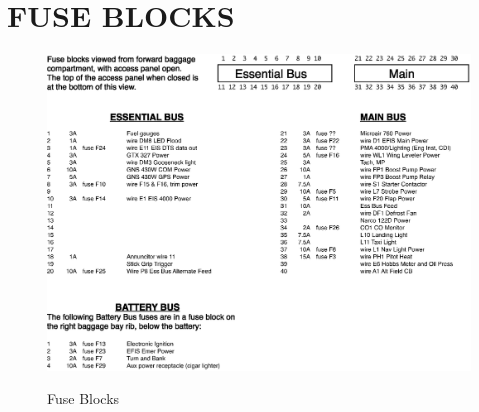 \section{FUSE BLOCKS}
\begin{figure}
  \centering
  \includegraphics[width=1.1\textwidth, angle=90]{../Diagrams/Fuse_Blocks_POH}
  \label{fig:FuseBlocks}
  \caption{Fuse Blocks}
\end{figure}
\cleardoublepage 
